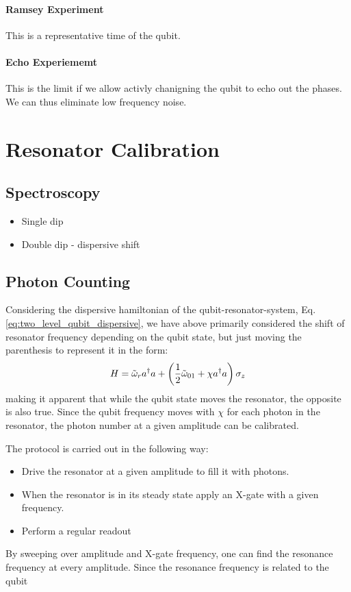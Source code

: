 \paragraph{Ramsey Experiment}
This is a representative time of the qubit.

\paragraph{Echo Experiememt}
This is the limit if we allow activly chanigning the qubit to echo out the phases. We can thus eliminate low frequency noise.


\section{Resonator Calibration}
\subsection{Spectroscopy}
\begin{itemize}
    \item Single dip
    \item Double dip - dispersive shift
\end{itemize}

\subsection{Photon Counting}
Considering the dispersive hamiltonian of the qubit-resonator-system, Eq. \ref{eq:two_level_qubit_dispersive}, we have above primarily considered the shift of resonator frequency depending on the qubit state, but just moving the parenthesis to represent it in the form:
\begin{equation}
    H = \Tilde{\omega}_r a^\dagger a  + \left(\frac12 \Tilde{\omega}_{01} + \chi a^\dagger a\right)  \sigma_z
\end{equation}
making it apparent that while the qubit state moves the resonator, the opposite is also true. Since the qubit frequency moves with $\chi$ for each photon in the resonator, the photon number at a given amplitude can be calibrated.  

The protocol is carried out in the following way:
\begin{itemize}
    \item Drive the resonator at a given amplitude to fill it with photons.
    \item When the resonator is in its steady state apply an X-gate with a given frequency.
    \item Perform a regular readout
\end{itemize}
By sweeping over amplitude and X-gate frequency, one can find the resonance frequency at every amplitude. Since the resonance frequency is related to the qubit \\

